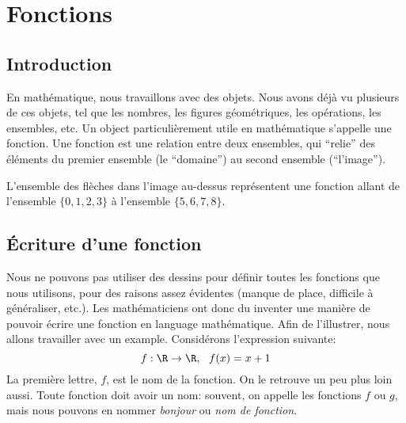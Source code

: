 \chapter{Fonctions}

\section{Introduction}

En mathématique, nous travaillons avec des objets. Nous avons déjà vu plusieurs de ces objets, tel que les nombres, les figures géométriques, les opérations, les ensembles, etc. Un object particulièrement utile en mathématique s'appelle une fonction. Une fonction est une relation entre deux ensembles, qui ``relie'' des éléments du premier ensemble (le ``domaine'') au second ensemble (``l'image'').

\begin{center}
\end{center}

L'ensemble des flèches dans l'image au-dessus représentent une fonction allant de l'ensemble $\{0,1,2,3\}$ à l'ensemble $\{5,6,7,8\}$.

\section{Écriture d'une fonction}

Nous ne pouvons pas utiliser des dessins pour définir toutes les fonctions que nous utilisons, pour des raisons assez évidentes (manque de place, difficile à généraliser, etc.). Les mathématiciens ont donc du inventer une manière de pouvoir écrire une fonction en language mathématique. Afin de l'illustrer, nous allons travailler avec un example. Considérons l'expression suivante:
\[
    f: \R \to \R, \ \ f(x) = x + 1
\]
La première lettre, $f$, est le nom de la fonction. On le retrouve un peu plus loin aussi. Toute fonction doit avoir un nom: souvent, on appelle les fonctions $f$ ou $g$, mais nous pouvons en nommer \textit{bonjour} ou \textit{nom de fonction}.

